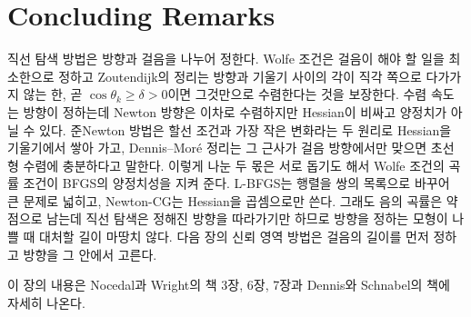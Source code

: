 \section{Concluding Remarks}

직선 탐색 방법은 방향과 걸음을 나누어 정한다. Wolfe 조건은 걸음이 해야 할 일을 최소한으로 정하고 Zoutendijk의 정리는 방향과 기울기 사이의 각이 직각 쪽으로 다가가지 않는 한, 곧 $\cos\theta_k\ge\delta>0$이면 그것만으로 수렴한다는 것을 보장한다. 수렴 속도는 방향이 정하는데 Newton 방향은 이차로 수렴하지만 Hessian이 비싸고 양정치가 아닐 수 있다. 준Newton 방법은 할선 조건과 가장 작은 변화라는 두 원리로 Hessian을 기울기에서 쌓아 가고, Dennis--Moré 정리는 그 근사가 걸음 방향에서만 맞으면 초선형 수렴에 충분하다고 말한다. 이렇게 나눈 두 몫은 서로 돕기도 해서 Wolfe 조건의 곡률 조건이 BFGS의 양정치성을 지켜 준다. L-BFGS는 행렬을 쌍의 목록으로 바꾸어 큰 문제로 넓히고, Newton-CG는 Hessian을 곱셈으로만 쓴다. 그래도 음의 곡률은 약점으로 남는데 직선 탐색은 정해진 방향을 따라가기만 하므로 방향을 정하는 모형이 나쁠 때 대처할 길이 마땅치 않다. 다음 장의 신뢰 영역 방법은 걸음의 길이를 먼저 정하고 방향을 그 안에서 고른다.

이 장의 내용은 Nocedal과 Wright의 책\cite{nocedal2006} 3장, 6장, 7장과 Dennis와 Schnabel의 책\cite{dennis1996}에 자세히 나온다.

\chapterreferences
